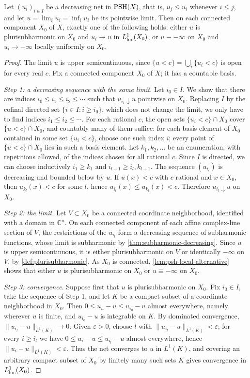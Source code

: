 \begin{theorem}\label{thm:psh-decreasing-nets}
Let $(u_i)_{i\in I}$ be a decreasing net in $\mathrm{PSH}(X)$, that is, $u_j\leq u_i$ whenever $i\leq j$, and let $u=\lim_iu_i=\inf_iu_i$ be its pointwise limit. Then on each connected component $X_0$ of $X$, exactly one of the following holds: either $u$ is plurisubharmonic on $X_0$ and $u_i\to u$ in $L^1_{\mathrm{loc}}(X_0)$, or $u\equiv-\infty$ on $X_0$ and $u_i\to-\infty$ locally uniformly on $X_0$.
\end{theorem}
\begin{proof}
The limit $u$ is upper semicontinuous, since $\{u<c\}=\bigcup_i\{u_i<c\}$ is open for every real $c$. Fix a connected component $X_0$ of $X$; it has a countable basis.

\emph{Step 1: a decreasing sequence with the same limit.} Let $i_0\in I$. We show that there are indices $i_0\leq i_1\leq i_2\leq\cdots$ such that $u_{i_l}\downarrow u$ pointwise on $X_0$. Replacing $I$ by the cofinal directed set $\{i\in I:i\geq i_0\}$, which does not change the limit, we only have to find indices $i_1\leq i_2\leq\cdots$. For each rational $c$, the open sets $\{u_i<c\}\cap X_0$ cover $\{u<c\}\cap X_0$, and countably many of them suffice: for each basis element of $X_0$ contained in some set $\{u_i<c\}$, choose one such index $i$; every point of $\{u<c\}\cap X_0$ lies in such a basis element. Let $k_1,k_2,\ldots$ be an enumeration, with repetitions allowed, of the indices chosen for all rational $c$. Since $I$ is directed, we can choose inductively $i_1\geq k_1$ and $i_{l+1}\geq i_l,k_{l+1}$. The sequence $(u_{i_l})$ is decreasing and bounded below by $u$. If $u(x)<c$ with $c$ rational and $x\in X_0$, then $u_{k_l}(x)<c$ for some $l$, hence $u_{i_l}(x)\leq u_{k_l}(x)<c$. Therefore $u_{i_l}\downarrow u$ on $X_0$.

\emph{Step 2: the limit.} Let $V\subset X_0$ be a connected coordinate neighborhood, identified with a domain in $\mathbb{C}^n$. On each connected component of each affine complex-line section of $V$, the restrictions of the $u_{i_l}$ form a decreasing sequence of subharmonic functions, whose limit is subharmonic by \cref{thm:subharmonic-decreasing}. Since $u$ is upper semicontinuous, it is either plurisubharmonic on $V$ or identically $-\infty$ on $V$, by \cref{def:plurisubharmonic}. As $X_0$ is connected, \cref{lem:psh-local-alternative} shows that either $u$ is plurisubharmonic on $X_0$ or $u\equiv-\infty$ on $X_0$.

\emph{Step 3: convergence.} Suppose first that $u$ is plurisubharmonic on $X_0$. Fix $i_0\in I$, take the sequence of Step 1, and let $K$ be a compact subset of a coordinate neighborhood in $X_0$. Then $0\leq u_{i_l}-u\leq u_{i_0}-u$ almost everywhere, namely wherever $u$ is finite, and $u_{i_0}-u$ is integrable on $K$. By dominated convergence, $\|u_{i_l}-u\|_{L^1(K)}\to0$. Given $\varepsilon>0$, choose $l$ with $\|u_{i_l}-u\|_{L^1(K)}<\varepsilon$; for every $i\geq i_l$ we have $0\leq u_i-u\leq u_{i_l}-u$ almost everywhere, hence $\|u_i-u\|_{L^1(K)}<\varepsilon$. Thus the net converges to $u$ in $L^1(K)$, and covering an arbitrary compact subset of $X_0$ by finitely many such sets $K$ gives convergence in $L^1_{\mathrm{loc}}(X_0)$.


\end{proof}
